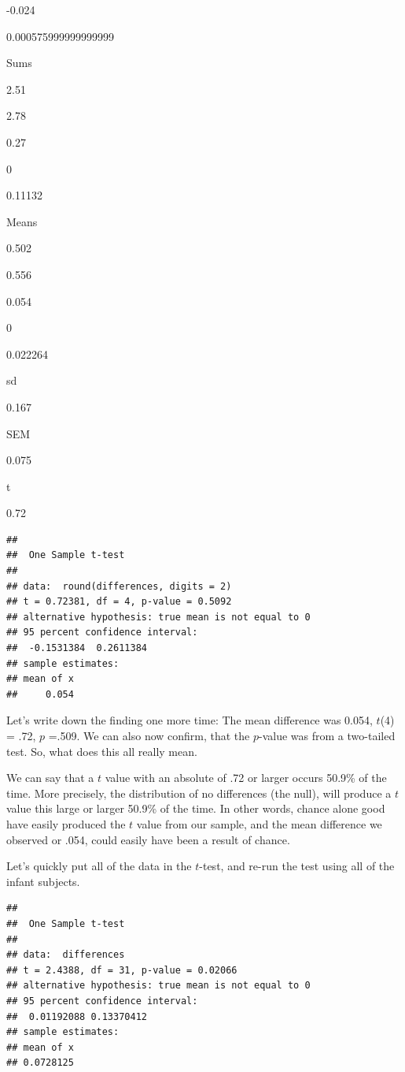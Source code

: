 \documentclass[
]{book}
\begin{document}
-0.024

0.000575999999999999

Sums

2.51

2.78

0.27

0

0.11132

Means

0.502

0.556

0.054

0

0.022264

sd

0.167

SEM

0.075

t

0.72

\begin{verbatim}
## 
## 	One Sample t-test
## 
## data:  round(differences, digits = 2)
## t = 0.72381, df = 4, p-value = 0.5092
## alternative hypothesis: true mean is not equal to 0
## 95 percent confidence interval:
##  -0.1531384  0.2611384
## sample estimates:
## mean of x 
##     0.054
\end{verbatim}

Let's write down the finding one more time: The mean difference was 0.054, \(t\)(4) = .72, \(p\) =.509. We can also now confirm, that the \(p\)-value was from a two-tailed test. So, what does this all really mean.

We can say that a \(t\) value with an absolute of .72 or larger occurs 50.9\% of the time. More precisely, the distribution of no differences (the null), will produce a \(t\) value this large or larger 50.9\% of the time. In other words, chance alone good have easily produced the \(t\) value from our sample, and the mean difference we observed or .054, could easily have been a result of chance.

Let's quickly put all of the data in the \(t\)-test, and re-run the test using all of the infant subjects.

\begin{verbatim}
## 
## 	One Sample t-test
## 
## data:  differences
## t = 2.4388, df = 31, p-value = 0.02066
## alternative hypothesis: true mean is not equal to 0
## 95 percent confidence interval:
##  0.01192088 0.13370412
## sample estimates:
## mean of x 
## 0.0728125
\end{verbatim}
\end{document}
